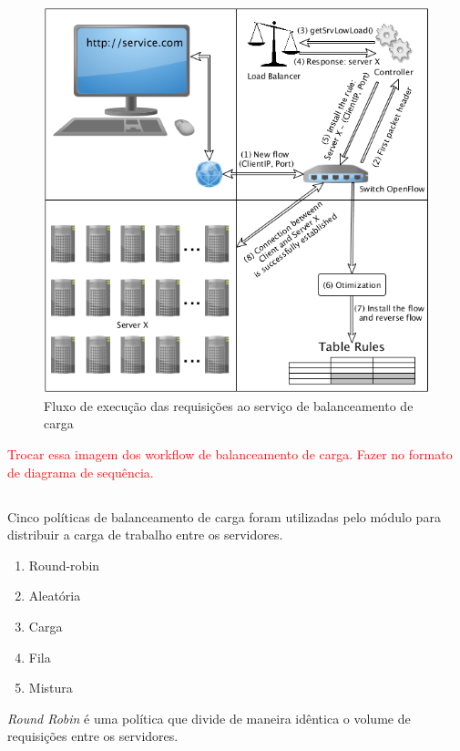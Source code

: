 \begin{figure}[htb!]
    \centering
    \includegraphics[width=\linewidth]{img/balancer-workflow}
    \caption{Fluxo de execução das requisições ao serviço de balanceamento 
    de carga}
    \label{fig:balancer-workflow}
\end{figure}

\textcolor{red}{Trocar essa imagem dos workflow de balanceamento de carga. 
Fazer no formato de diagrama de sequência.}

\subsection{}

Cinco políticas de balanceamento de carga foram utilizadas pelo módulo para 
distribuir a carga de trabalho entre os servidores.

\begin{enumerate}
    \item Round-robin
    \item Aleatória
    \item Carga
    \item Fila 
    \item Mistura
\end{enumerate}

\emph{Round Robin} é uma política que divide de maneira idêntica o volume de
requisições entre os servidores.

